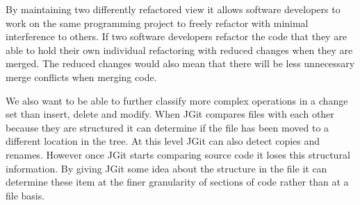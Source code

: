 By maintaining two differently refactored view it allows software developers to work on the same programming project to freely refactor with minimal interference to others.
If two software developers refactor the code that they are able to hold their own individual refactoring with reduced changes when they are merged.
The reduced changes would also mean that there will be less unnecessary merge conflicts when merging code.

We also want to be able to further classify more complex operations in a change set than insert, delete and modify.  When JGit compares files with each other because they are structured it can determine if the file has been moved to a different location in the tree.  At this level JGit can also detect copies and renames.  However once JGit starts comparing source code it loses this structural information.  By giving JGit some idea about the structure in the file it can determine these item at the finer granularity of sections of code rather than at a file basis.
